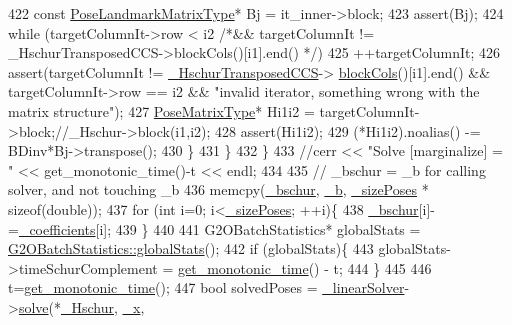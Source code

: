 \begin{DoxyCode}
422         \textcolor{keyword}{const} \hyperlink{classg2o_1_1BlockSolver_a96bf60b923f816086cd2f24de38736ec}{PoseLandmarkMatrixType}* Bj = it\_inner->block;
423         assert(Bj); 
424         \textcolor{keywordflow}{while} (targetColumnIt->row < i2 \textcolor{comment}{/*&& targetColumnIt != \_HschurTransposedCCS->blockCols()[i1].end()
      */})
425           ++targetColumnIt;
426         assert(targetColumnIt != \hyperlink{classg2o_1_1BlockSolver_acea4b8ea8db5a29b63bea4bc568b0b26}{\_HschurTransposedCCS}->
      \hyperlink{classg2o_1_1SparseBlockMatrixCCS_ae43c6599984015bdc3d481266e1555ea}{blockCols}()[i1].end() && targetColumnIt->row == i2 && \textcolor{stringliteral}{"invalid iterator, something wrong with the
       matrix structure"});
427         \hyperlink{classg2o_1_1BlockSolver_a8c7c43d361bd31e3e0353889ba703bc0}{PoseMatrixType}* Hi1i2 = targetColumnIt->block;\textcolor{comment}{//\_Hschur->block(i1,i2);}
428         assert(Hi1i2);
429         (*Hi1i2).noalias() -= BDinv*Bj->transpose();
430       \}
431     \}
432   \}
433   \textcolor{comment}{//cerr << "Solve [marginalize] = " <<  get\_monotonic\_time()-t << endl;}
434 
435   \textcolor{comment}{// \_bschur = \_b for calling solver, and not touching \_b}
436   memcpy(\hyperlink{classg2o_1_1BlockSolver_aafddeb1d0a4218fc9c3c77169e20f81a}{\_bschur}, \hyperlink{classg2o_1_1Solver_a52c92c9bf5db0da3322da3a02dbeb245}{\_b}, \hyperlink{classg2o_1_1BlockSolver_a39ec000379885ce09cdd8c23ab6d4567}{\_sizePoses} * \textcolor{keyword}{sizeof}(\textcolor{keywordtype}{double}));
437   \textcolor{keywordflow}{for} (\textcolor{keywordtype}{int} i=0; i<\hyperlink{classg2o_1_1BlockSolver_a39ec000379885ce09cdd8c23ab6d4567}{\_sizePoses}; ++i)\{
438     \hyperlink{classg2o_1_1BlockSolver_aafddeb1d0a4218fc9c3c77169e20f81a}{\_bschur}[i]-=\hyperlink{classg2o_1_1BlockSolver_a416f480d4b27d7f8962ae7ae363f2e32}{\_coefficients}[i];
439   \}
440 
441   G2OBatchStatistics* globalStats = \hyperlink{structg2o_1_1G2OBatchStatistics_a06f9c667d8b48b8f0023e27011818b64}{G2OBatchStatistics::globalStats}();
442   \textcolor{keywordflow}{if} (globalStats)\{
443     globalStats->timeSchurComplement = \hyperlink{namespaceg2o_aa64237935c7d8411b4369234a5f661ea}{get\_monotonic\_time}() - t;
444   \}
445 
446   t=\hyperlink{namespaceg2o_aa64237935c7d8411b4369234a5f661ea}{get\_monotonic\_time}();
447   \textcolor{keywordtype}{bool} solvedPoses = \hyperlink{classg2o_1_1BlockSolver_a676a4ef473ccaecb23050284e19659af}{\_linearSolver}->\hyperlink{classg2o_1_1LinearSolver_aa44b40826d50203c8ce2ff258c34e030}{solve}(*\hyperlink{classg2o_1_1BlockSolver_a46977934a3e4fb0cd36bc4181ed3ec0e}{\_Hschur}, \hyperlink{classg2o_1_1Solver_a94ee5e303a754f4ff338a7b032c214ae}{\_x}, 

\end{DoxyCode}
